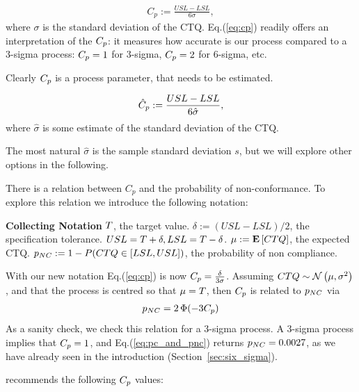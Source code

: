 \begin{definition}[$\cp$]
\begin{align}
\label{eq:cp}
	C_p:= \frac{USL-LSL}{6 \sigma}, 
\end{align}
where $\sigma$ is the standard deviation of the CTQ.
Eq.(\ref{eq:cp}) readily offers an interpretation of the $\cp$: it measures how accurate is our process compared to a 3-sigma process: $C_p=1$ for 3-sigma, $C_p=2$ for 6-sigma, etc.
\end{definition}
Clearly $\cp$ is a process parameter, that needs to be estimated.
\begin{definition}[$\cpHat$]
\begin{align}
	\hat{C}_p:= \frac{USL-LSL}{6 \hat{\sigma}}, 
\end{align}
where $\hat{\sigma}$ is some estimate of the standard deviation of the CTQ.
\end{definition}
The most natural $\hat{\sigma}$ is the sample standard deviation $s$, but we will explore other options in the following.


There is a relation between $C_p$ and the probability of non-conformance. 
To explore this relation we introduce the following notation:
\begin{tcolorbox}
\footnotesize
\textbf{Collecting Notation} \newline
$T$, the target value. \newline
$\delta:= (USL-LSL)/2$, the specification tolerance. $USL=T+\delta, LSL=T-\delta$.  \newline
$\mu:= \mathbf{E}\left[ CTQ \right]$, the expected CTQ. \newline
$p_{NC}:= 1-P(CTQ \in [LSL,USL])$, the probability of non compliance. 
\end{tcolorbox}

With our new notation Eq.(\ref{eq:cp}) is now $C_p=\frac{\delta}{3 \sigma}$.
Assuming $CTQ \sim \mathcal{N}\left(\mu, \sigma^2\right)$, and that the process is centred so that $\mu=T$, then $\cp$ is related to $p_{NC}$ via
\begin{align}
\label{eq:pc_and_pnc}
	p_{NC}= 2\, \Phi(-3 C_p)
\end{align}
As a sanity check, we check this relation for a 3-sigma process.
A 3-sigma process implies that $C_p=1$, and Eq.(\ref{eq:pc_and_pnc}) returns $p_{NC}=0.0027$, as we have already seen in the introduction (Section~\ref{sec:six_sigma}).

\cite{montgomery_introduction_2007} recommends the following $\cp$ values:

